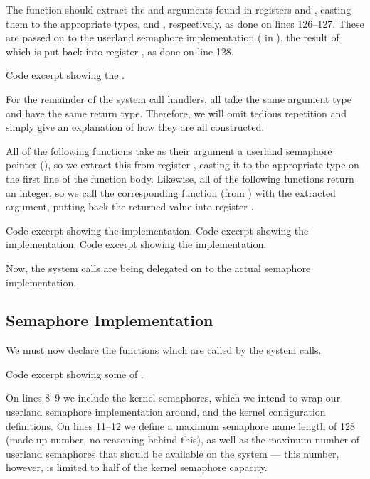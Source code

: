 The  function should extract the 
and  arguments found in registers  and , casting
them to the appropriate types,  and ,
respectively, as done on lines 126--127. These are passed on to the userland
semaphore implementation ( in
), the result of which is put back into register
, as done on line 128.

{Code excerpt showing the .}

For the remainder of the system call handlers, all take the same argument type
and have the same return type. Therefore, we will omit tedious repetition and
simply give an explanation of how they are all constructed.

All of the following functions take as their argument a userland semaphore
pointer (), so we extract this from register ,
casting it to the appropriate type on the first line of the function body.
Likewise, all of the following functions return an integer, so we call the
corresponding function (from ) with the extracted
argument, putting back the returned value into register .

{Code excerpt showing the  implementation.}
{Code excerpt showing the  implementation.}
{Code excerpt showing the  implementation.}

Now, the system calls are being delegated on to the actual semaphore
implementation.

\newpage
\subsection{Semaphore Implementation}
We must now declare the functions which are called by the system calls.

{Code excerpt showing some of .}

On lines 8--9 we include the kernel semaphores, which we intend to wrap our
userland semaphore implementation around, and the kernel configuration
definitions. On lines 11--12 we define a maximum semaphore name length of
128 (made up number, no reasoning behind this), as well as the maximum number
of userland semaphores that should be available on the system --- this number,
however, is limited to half of the kernel semaphore capacity.

